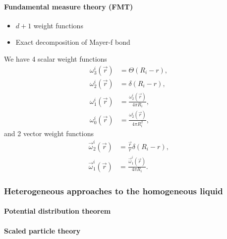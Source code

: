 \paragraph{Fundamental measure theory (FMT)}
\begin{itemize}
\item $d+1$ weight functions
\item Exact decomposition of Mayer-f bond
\end{itemize}

We have 4 scalar weight functions
\begin{subequations}
  \begin{align}
    \omega_3^i(\vec{r}) &= \Theta(R_i - r), \\
    \omega_2^i(\vec{r}) &= \delta(R_i - r), \\
    \omega_1^i(\vec{r}) &= \frac{\omega_2^i(\vec{r})}{4\pi R_i}, \\
    \omega_0^i(\vec{r}) &= \frac{\omega_2^i(\vec{r})}{4\pi R_i^2},
  \end{align}
\end{subequations}
and 2 vector weight functions
\begin{subequations}
  \begin{align}
    \vec{\omega}_2^i(\vec{r}) &=
    \frac{\vec{r}}{r} \delta(R_i - r), \\
    \vec{\omega}_1^i(\vec{r}) &=
    \frac{\vec{\omega}_1^i(\vec{r})}{4\pi R_i}.
  \end{align}
\end{subequations}

\subsubsection{Heterogeneous approaches to the homogeneous liquid}
\paragraph{Potential distribution theorem}
\paragraph{Scaled particle theory}
